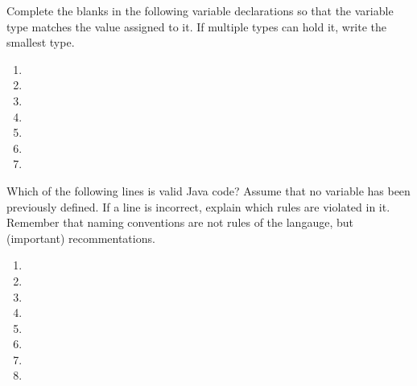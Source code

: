 

\exercisesection

\begin{exercise}
Complete the blanks in the following variable declarations so that the variable type matches the value assigned to it. If multiple types can hold it, write the smallest type.
\begin{enumerate}
\item {}
\item {}
\item {}
\item {}
\item {}
\item {}
\item {}
\end{enumerate}
\end{exercise}

\begin{exercise}
Which of the following lines is valid Java code? Assume that no variable has been previously defined. If a line is incorrect, explain which rules are violated in it. Remember that naming conventions are not rules of the langauge, but (important) recommentations.
\begin{enumerate}
\item {}
\item {}
\item {}
\item {}
\item {}
\item {}
\item {}
\item {}
\end{enumerate}
\end{exercise}

